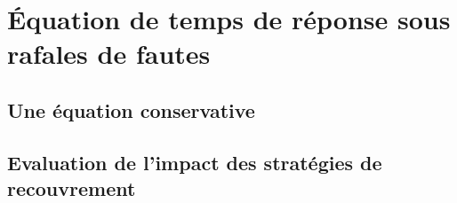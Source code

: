 \section{\'Equation de temps de réponse sous rafales de fautes}
\label{sec:contribution_tf_ordo_fb_wcrt}

\subsection{Une équation conservative}
\subsection{Evaluation de l'impact des stratégies de recouvrement}



